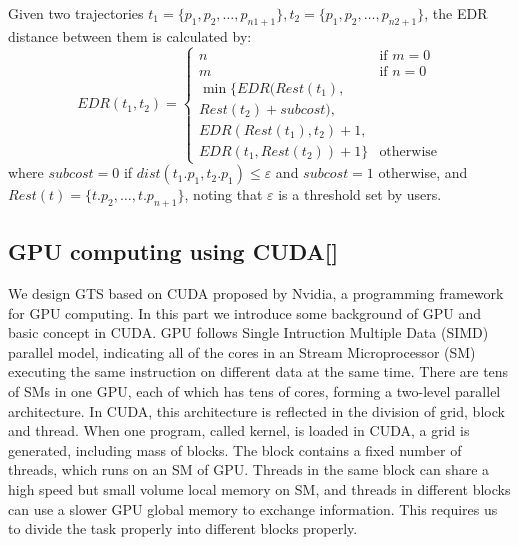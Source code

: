 \documentclass[conference]{IEEEtran}
\begin{document}
	\begin{define}
		Given two trajectories $t_{1}=\{p_{1},p_{2},\ldots,p_{n1+1}\},t_{2}=\{p_{1},p_{2},\ldots,p_{n2+1}\}$, the EDR distance between them is calculated by:
		\begin{equation*}
		EDR(t_{1},t_{2}) = 
		\begin{cases}
		n & \text{if $m=0$} \\
		m & \text{if $n=0$} \\
		\min \{EDR(Rest(t_{1}),\\Rest(t_{2})+subcost),\\EDR(Rest(t_{1}),t_{2})+1,\\EDR(t_{1},Rest(t_{2}))+1\} & \text{otherwise}
		\end{cases}
		\end{equation*}
		where $subcost = 0$ if $dist(t_{1}.p_{1},t_{2}.p_{1})\leqslant \varepsilon$ and $subcost = 1$ otherwise, and $Rest(t)=\{t.p_{2},\ldots ,t.p_{n+1}\}$, noting that $\varepsilon$ is a threshold set by users.
	\end{define}
	

\subsection{GPU computing using CUDA[]}
We design GTS based on CUDA proposed by Nvidia, a programming framework for GPU computing. In this part we introduce some background of GPU and basic concept in CUDA. GPU follows Single Intruction Multiple Data (SIMD) parallel model, indicating all of the cores in an Stream Microprocessor (SM) executing the same instruction on different data at the same time. There are tens of SMs in one GPU, each of which has tens of cores, forming a two-level parallel architecture. In CUDA, this architecture is reflected in the division of grid, block and thread. When one program, called kernel, is loaded in CUDA, a grid is generated, including mass of blocks. The block contains a fixed number of threads, which runs on an SM of GPU. Threads in the same block can share a high speed but small volume local memory on SM, and threads in different blocks can use a slower GPU global memory to exchange information. This requires us to divide the task properly into different blocks properly. 
\end{document}
